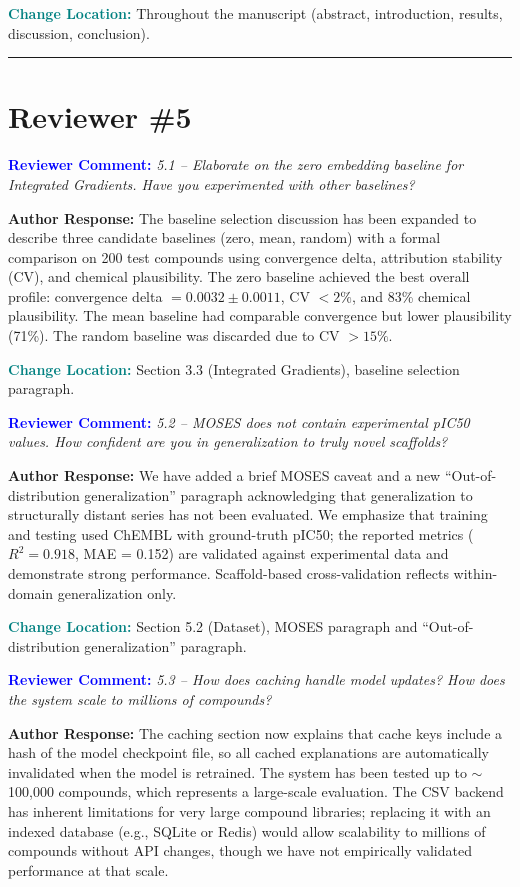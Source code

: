 \documentclass[12pt]{article}
\newcommand{\RC}[1]{\textbf{\textcolor{blue}{Reviewer Comment:}} \textit{#1}\vspace{0.3em}}
\newcommand{\AR}[1]{\textbf{Author Response:} #1\vspace{0.8em}}
\newcommand{\CH}[1]{\textbf{\textcolor{teal}{Change Location:}} #1\vspace{0.5em}}
\begin{document}
\CH{Throughout the manuscript (abstract, introduction, results, discussion, conclusion).}

\bigskip
\hrule
\bigskip

\section*{Reviewer \#5}

\RC{5.1 -- Elaborate on the zero embedding baseline for Integrated Gradients. Have you experimented with other baselines?}

\AR{The baseline selection discussion has been expanded to describe three candidate baselines (zero, mean, random) with a formal comparison on 200 test compounds using convergence delta, attribution stability (CV), and chemical plausibility. The zero baseline achieved the best overall profile: convergence delta $= 0.0032 \pm 0.0011$, CV $< 2\%$, and 83\% chemical plausibility. The mean baseline had comparable convergence but lower plausibility (71\%). The random baseline was discarded due to CV $> 15\%$.}

\CH{Section 3.3 (Integrated Gradients), baseline selection paragraph.}

\bigskip

\RC{5.2 -- MOSES does not contain experimental pIC50 values. How confident are you in generalization to truly novel scaffolds?}

\AR{We have added a brief MOSES caveat and a new ``Out-of-distribution generalization'' paragraph acknowledging that generalization to structurally distant series has not been evaluated. We emphasize that training and testing used ChEMBL with ground-truth pIC50; the reported metrics ($R^2 = 0.918$, MAE = 0.152) are validated against experimental data and demonstrate strong performance. Scaffold-based cross-validation reflects within-domain generalization only.}

\CH{Section 5.2 (Dataset), MOSES paragraph and ``Out-of-distribution generalization'' paragraph.}

\bigskip

\RC{5.3 -- How does caching handle model updates? How does the system scale to millions of compounds?}

\AR{The caching section now explains that cache keys include a hash of the model checkpoint file, so all cached explanations are automatically invalidated when the model is retrained. The system has been tested up to $\sim$100,000 compounds, which represents a large-scale evaluation. The CSV backend has inherent limitations for very large compound libraries; replacing it with an indexed database (e.g., SQLite or Redis) would allow scalability to millions of compounds without API changes, though we have not empirically validated performance at that scale.}
\end{document}
